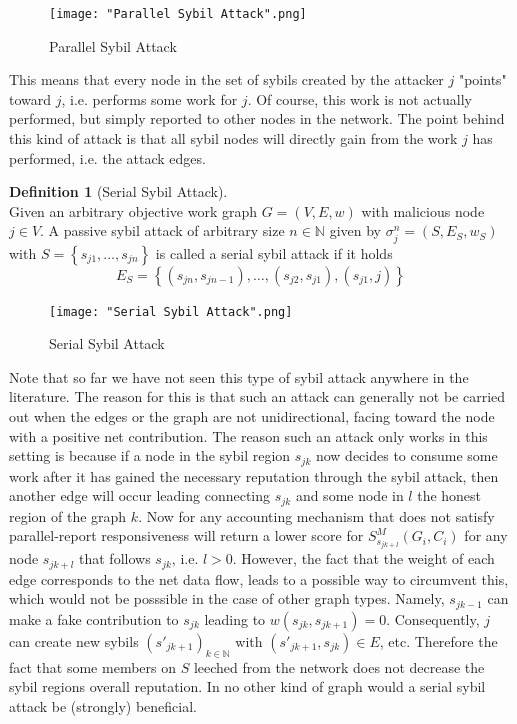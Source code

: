 \documentclass[11pt,a4paper]{article}
\theoremstyle{definition}
\newtheorem{definition}{Definition}[section]
\theoremstyle{theorem}
\theoremstyle{proposition}
\theoremstyle{corollary}
\theoremstyle{lemma}
\theoremstyle{example}
\theoremstyle{remark}
\begin{document}
\begin{figure}[H]
\begin{center}
\texttt{[image: "Parallel Sybil Attack".png]}
\caption{Parallel Sybil Attack}
\label{fig:Parallel Sybil Attack}
\end{center}
\end{figure}

\noindent{}This means that every node in the set of sybils created by the attacker $j$ "points" toward $j$, i.e. performs some work for $j$. Of course, this work is not actually performed, but simply reported to other nodes in the network. The point behind this kind of attack is that all sybil nodes will directly gain from the work $j$ has performed, i.e. the attack edges. \vspace{1em}\\

\begin{definition}[Serial Sybil Attack]\ \\
Given an arbitrary objective work graph $G=(V,E,w)$ with malicious node $j\in{}V$. A passive sybil attack of arbitrary size $n\in\mathbb{N}$ given by $\sigma^n_j=(S,E_S,w_S)$ with $S=\left\lbrace{}s_{j1},\ldots,s_{jn}\right\rbrace$ is called a serial sybil attack if it holds
\[
E_S=\left\lbrace{}(s_{jn},s_{jn-1}),\ldots,(s_{j2},s_{j1}), (s_{j1},j)\right\rbrace
\]
\end{definition}

\begin{figure}[H]
\begin{center}
\texttt{[image: "Serial Sybil Attack".png]}
\caption{Serial Sybil Attack}
\label{fig:Serial Sybil Attack}
\end{center}
\end{figure}

\noindent{}Note that so far we have not seen this type of sybil attack anywhere in the literature. The reason for this is that such an attack can generally not be carried out when the edges or the graph are not unidirectional, facing toward the node with a positive net contribution. The reason such an attack only works in this setting is because if a node in the sybil region $s_{jk}$ now decides to consume some work after it has gained the necessary reputation through the sybil attack, then another edge will occur leading connecting $s_{jk}$ and some node in $l$ the honest region of the graph $k$. Now for any accounting mechanism that does not satisfy parallel-report responsiveness will return a lower score for $S^M_{s_{jk+l}}(G_i,C_i)$ for any node $s_{jk+l}$ that follows $s_{jk}$, i.e. $l>0$. However, the fact that the weight of each edge corresponds to the net data flow, leads to a possible way to circumvent this, which would not be posssible in the case of other graph types. Namely, $s_{jk-1}$ can make a fake contribution to $s_{jk}$ leading to $w(s_{jk},s_{jk+1})=0$. Consequently, $j$ can create new sybils $(s'_{jk+1})_{k\in\mathbb{N}}$ with $(s'_{jk+1},s_{jk})\in{}E$, etc. Therefore the fact that some members on $S$ leeched from the network does not decrease the sybil regions overall reputation. In no other kind of graph would a serial sybil attack be (strongly) beneficial. \vspace{1em}\\ 
\end{document}
